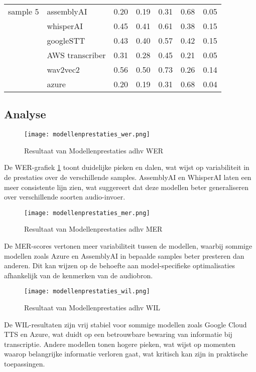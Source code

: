\begin{table}[htbp]
\begin{tabularx}{\textwidth}{|l|l|X|X|X|X|X|}
         sample 5 & assemblyAI & 0.20 & 0.19 & 0.31 & 0.68 & 0.05\\
        & whisperAI & 0.45 & 0.41 & 0.61 & 0.38 & 0.15\\
        & googleSTT & 0.43 & 0.40 & 0.57 & 0.42  & 0.15 \\
        & AWS transcriber & 0.31 & 0.28 & 0.45 & 0.21 & 0.05 \\
        & wav2vec2 & 0.56 & 0.50 & 0.73 & 0.26 & 0.14 \\
        & azure & 0.20 & 0.19 & 0.31 & 0.68 & 0.04 \\
        \hline
        
                
    \end{tabularx}
\end{table}
\FloatBarrier 

\subsection{Analyse}

\begin{figure}[h]
    \centering
    \texttt{[image: modellenprestaties\_wer.png]}
    \captionsetup{justification=centering}
    \caption{Resultaat van Modellenprestaties adhv WER}
    \label{fig:modellenprestaties_wer}
\end{figure}
\FloatBarrier
De WER-grafiek \ref{fig:modellenprestaties_wer} toont duidelijke pieken en dalen, wat wijst op variabiliteit in de prestaties over de verschillende samples. AssemblyAI en WhisperAI laten een meer consistente lijn zien, wat suggereert dat deze modellen beter generaliseren over verschillende soorten audio-invoer.
\begin{figure}[h]
    \centering
    \texttt{[image: modellenprestaties\_mer.png]}
    \captionsetup{justification=centering}
    \caption{Resultaat van Modellenprestaties adhv MER}
    \label{fig:modellenprestaties_mer}
\end{figure}
\FloatBarrier
De MER-scores vertonen meer variabiliteit tussen de modellen, waarbij sommige modellen zoals Azure en AssemblyAI in bepaalde samples beter presteren dan anderen. Dit kan wijzen op de behoefte aan model-specifieke optimalisaties afhankelijk van de kenmerken van de audiobron.


\begin{figure}[h]
    \centering
    \texttt{[image: modellenprestaties\_wil.png]}
    \captionsetup{justification=centering}
    \caption{Resultaat van Modellenprestaties adhv WIL}
    \label{fig:modellenprestaties}
\end{figure}
\FloatBarrier
De WIL-resultaten zijn vrij stabiel voor sommige modellen zoals Google Cloud TTS en Azure, wat duidt op een betrouwbare bewaring van informatie bij transcriptie. Andere modellen tonen hogere pieken, wat wijst op momenten waarop belangrijke informatie verloren gaat, wat kritisch kan zijn in praktische toepassingen.


